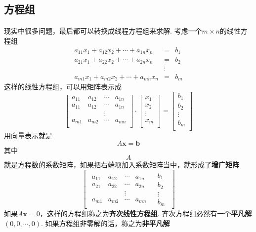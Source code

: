 \subsection{方程组}
\paragraph{}
现实中很多问题，最后都可以转换成线程方程组来求解.  考虑一个$m\times n$的线性方程组
$$
\begin{array}{lcl}
a_{11}x_1 + a_{12}x_2 + \cdots + a_{1n}x_n & = & b_1  \\
a_{21}x_1 + a_{22}x_2 + \cdots + a_{2n}x_n & = & b_2  \\
 & \vdots &   \\
a_{m1}x_1 + a_{m2}x_2 + \cdots + a_{mn}x_n & = & b_m  
\end{array}
$$
这样的线性方程组，可以用矩阵表示成
$$
\begin{bmatrix}
    a_{11} & a_{12} & \cdots & a_{1n} \\
    a_{11} & a_{12} & \cdots & a_{1n} \\
     &  & \vdots &  \\
    a_{m1} & a_{m2} & \cdots & a_{mn} \\
  \end{bmatrix} \cdot 
  \begin{bmatrix}
    x_{1}  \\
    x_{2} \\
    \vdots  \\
    x_{m} \\
  \end{bmatrix}  = \begin{bmatrix}
    b_{1}  \\
    b_{2} \\
    \vdots  \\
    b_{m} \\
  \end{bmatrix} 
$$
用向量表示就是
$$
A\textbf{x} = \textbf{b}
$$
其中$$A$$就是方程数的系数矩阵，如果把右端项加入系数矩阵当中，就形成了\textbf{增广矩阵}
$$
\left[
{\begin{array}{c|c}
\begin{matrix}
a_{11} & a_{12} & \cdots & a_{1n} \\
a_{21} & a_{22} & \cdots & a_{2n} \\
 & & \vdots &  \\
a_{m1} & a_{m2} & \cdots & a_{mn} 
\end{matrix}&
\begin{matrix}
b_1\\
b_2 \\
\vdots \\
b_m 
\end{matrix}
\end{array}
}
\right]
$$
如果$A\textbf{x} = 0$，这样的方程组称之为\textbf{齐次线性方程组}. 齐次方程组必然有一个\textbf{平凡解}$(0, 0, \cdots, 0)$. 如果方程组非零解的话，称之为\textbf{非平凡解}

